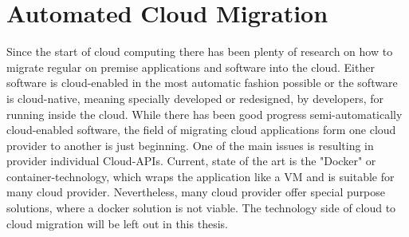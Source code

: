 \section{Automated Cloud Migration}
\label{sec:RelatedWork:cloud_migration}

Since the start of cloud computing there has been plenty of research on how to migrate regular on premise applications and software into the cloud. Either software is cloud-enabled in the most automatic fashion possible or the software is cloud-native, meaning specially developed or redesigned, by developers, for running inside the cloud. While there has been good progress semi-automatically cloud-enabled software, the field of migrating cloud applications form one cloud provider to another is just beginning. One of the main issues is resulting in provider individual Cloud-APIs. Current, state of the art is the "Docker" or container-technology, which wraps the application like a VM and is suitable for many cloud provider. Nevertheless, many cloud provider offer special purpose solutions, where a docker solution is not viable. The technology side of cloud to cloud migration will be left out in this thesis. \cite{Jambunathan.February2016}\cite{Binz.2014} 